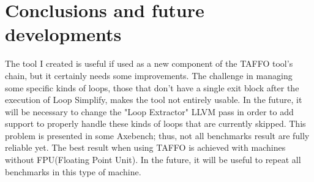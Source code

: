 \section{Conclusions and future developments}

The tool I created is useful if used as a new component of the TAFFO tool's chain, but it certainly needs some improvements.
The challenge in managing some specific kinds of loops, those that don't have a single exit block after the execution of Loop Simplify, makes the tool not entirely usable.
In the future, it will be necessary to change the "Loop Extractor" LLVM pass in order to add support to properly handle these kinds of loops that are currently skipped.
This problem is presented in some Axebench; thus, not all benchmarks result are fully reliable yet.
The best result when using TAFFO is achieved with machines without FPU(Floating Point Unit). In the future, it will be useful to repeat all benchmarks in this type of machine.


